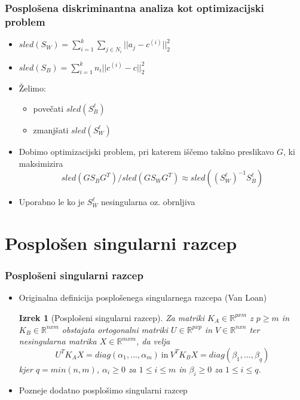 \documentclass{beamer}
\newtheorem{izrek}{Izrek}
\begin{document}
\begin{frame}
\frametitle{Posplošena diskriminantna analiza kot optimizacijski problem}
\begin{itemize}
\item $ sled(S_W) = \sum_{i = 1}^{k} \sum_{j \in N_i} || a_j - c^{(i)}||_2^2$
\item $ sled(S_B) = \sum_{i = 1}^{k} n_i || c^{(i)} - c||_2^2$
\item Želimo:
\begin{itemize}
\item povečati $sled(S_B^\ell)$
\item zmanjšati $sled(S_W^\ell)$
\end{itemize}
\item Dobimo optimizacijski problem, pri katerem iščemo takšno preslikavo $G$, ki maksimizira
$$sled( G S_B G^T) / sled( G S_W G^T) \approx sled((S_W^\ell)^{-1}S_B^\ell)$$
\item Uporabno le ko je $S_W^\ell$ nesingularna oz. obrnljiva
\end{itemize}
\end{frame}


\section{Posplošen singularni razcep}

\begin{frame}
\frametitle{Posplošeni singularni razcep}
\begin{itemize}
\item Originalna definicija posplošenega singularnega razcepa (Van Loan)
\begin{izrek}[Posplošeni singularni razcep]
\label{izrek:GSVD} Za matriki $K_A \in \mathbb{R}^{pxm}$ z $p \geqslant m$ in $K_B \in \mathbb{R}^{nxm}$ obstajata ortogonalni matriki $U \in \mathbb{R}^{pxp}$ in $V \in \mathbb{R}^{nxn}$ ter nesingularna matrika $X \in \mathbb{R}^{mxm}$, da velja $$ U^T K_A X = diag(\alpha_1,..., \alpha_m) \ \text{in} \ V^T K_B X = diag(\beta_1,..., \beta_q) $$ kjer $q = min(n,m)$, $\alpha_i \geqslant 0$ za $1 \leqslant i \leqslant m$ in  $\beta_i \geqslant 0$ za  $1 \leqslant i \leqslant q$.
\end{izrek}
\item Pozneje dodatno posplošimo singularni razcep
\end{itemize}
\end{frame}
\end{document}
